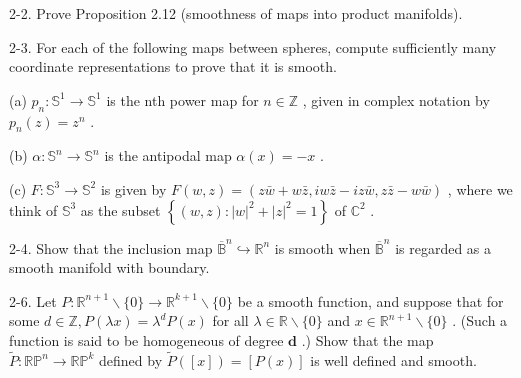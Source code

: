 \begin{exercise}
\label{prob:2-2}


2-2. Prove Proposition 2.12 (smoothness of maps into product manifolds).
\end{exercise}

\begin{exercise}
\label{prob:2-3}


2-3. For each of the following maps between spheres, compute sufficiently many coordinate representations to prove that it is smooth.

(a) ${p}_{n} : {\mathbb{S}}^{1} \rightarrow  {\mathbb{S}}^{1}$ is the nth power map for $n \in  \mathbb{Z}$ , given in complex notation by ${p}_{n}\left( z\right)  = {z}^{n}$ .

(b) $\alpha  : {\mathbb{S}}^{n} \rightarrow  {\mathbb{S}}^{n}$ is the antipodal map $\alpha \left( x\right)  =  - x$ .

(c) $F : {\mathbb{S}}^{3} \rightarrow  {\mathbb{S}}^{2}$ is given by $F\left( {w, z}\right)  = \left( {z\bar{w} + w\bar{z},{iw}\bar{z} - {iz}\bar{w}, z\bar{z} - w\bar{w}}\right)$ , where we think of ${\mathbb{S}}^{3}$ as the subset $\left\{  {\left( {w, z}\right)  : {\left| w\right| }^{2} + {\left| z\right| }^{2} = 1}\right\}$ of ${\mathbb{C}}^{2}$ .
\end{exercise}

\begin{exercise}
\label{prob:2-4}


2-4. Show that the inclusion map ${\overline{\mathbb{B}}}^{n} \hookrightarrow  {\mathbb{R}}^{n}$ is smooth when ${\overline{\mathbb{B}}}^{n}$ is regarded as a smooth manifold with boundary.
\end{exercise}

\begin{exercise}
\label{prob:2-6}


2-6. Let $P : {\mathbb{R}}^{n + 1} \smallsetminus  \{ 0\}  \rightarrow  {\mathbb{R}}^{k + 1} \smallsetminus  \{ 0\}$ be a smooth function, and suppose that for some $d \in  \mathbb{Z}, P\left( {\lambda x}\right)  = {\lambda }^{d}P\left( x\right)$ for all $\lambda  \in  \mathbb{R} \smallsetminus  \{ 0\}$ and $x \in  {\mathbb{R}}^{n + 1} \smallsetminus  \{ 0\}$ . (Such a function is said to be homogeneous of degree $\mathbf{d}$ .) Show that the map $\widetilde{P} : {\mathbb{{RP}}}^{n} \rightarrow  {\mathbb{{RP}}}^{k}$ defined by $\widetilde{P}\left( \left\lbrack  x\right\rbrack  \right)  = \left\lbrack  {P\left( x\right) }\right\rbrack$ is well defined and smooth.
\end{exercise}

